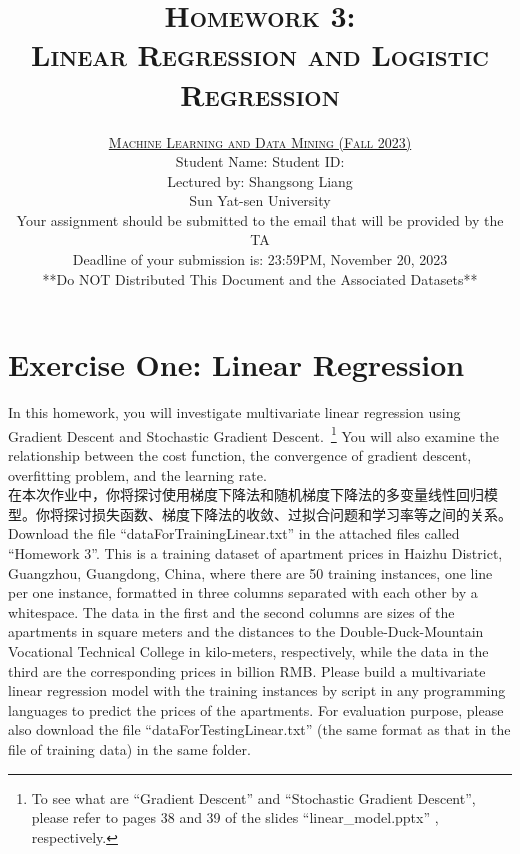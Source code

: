 \documentclass[a4paper]{article}
\title{\textsc{Homework 3: \\  Linear Regression and Logistic Regression}} %
\author{\href{xx}{\textsc{Machine Learning and Data Mining (Fall 2023)}} \\[0.5em] 
Student Name: \hspace{13em} Student ID: \\[0.5em]
Lectured by: Shangsong Liang \\
Sun Yat-sen University\\
Your assignment should be submitted to the email that will be provided by the TA \\
Deadline of your submission is: 23:59PM, November 20, 2023\\
**Do NOT Distributed This Document and the Associated Datasets**}
\date{}
\theoremstyle{definition}
\begin{document}
\maketitle
\section{Exercise One: Linear Regression}
In this homework, you will investigate multivariate linear regression using Gradient Descent  and Stochastic Gradient Descent.~\footnote{To see what are ``Gradient Descent'' and ``Stochastic Gradient Descent'', please refer to pages 38 and 39 of the slides ``linear\_model.pptx'' , respectively.} You will also examine the relationship between the cost function, the convergence of gradient descent, overfitting problem, and the learning rate.\\

在本次作业中，你将探讨使用梯度下降法和随机梯度下降法的多变量线性回归模型。你将探讨损失函数、梯度下降法的收敛、过拟合问题和学习率等之间的关系。\\

Download the file “dataForTrainingLinear.txt” in the attached files called “Homework 3”. This is a training dataset of apartment prices in Haizhu District, Guangzhou, Guangdong, China, where there are 50 training instances, one line per one instance, formatted in three columns separated with each other by a whitespace. The data in the first and the second columns are sizes of the apartments in square meters and the distances to the Double-Duck-Mountain Vocational Technical College in kilo-meters, respectively, while the data in the third are the corresponding prices in billion RMB. Please build a multivariate linear regression model with the training instances by script in any programming languages to predict the prices of the apartments. For evaluation purpose, please also download the file “dataForTestingLinear.txt” (the same format as that in the file of training data) in the same folder.\\
\end{document}
